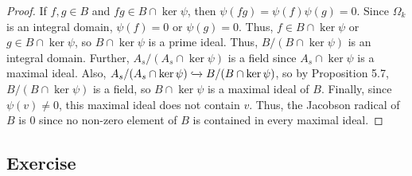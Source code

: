 \begin{proof}
If $f,g\in B$ and $fg \in B \cap \ker \psi$, then $\psi(fg) = \psi(f)\psi(g) = 0$. Since $\Omega_k$ is an integral domain, $\psi(f) = 0$ or $\psi(g) = 0$. 
Thus, $f \in B \cap \ker \psi$ or $g \in B \cap \ker \psi$, so $B \cap \ker \psi$ is a prime ideal. Thus, $B / (B \cap \ker \psi)$ is an integral domain.
Further, $A_s / (A_s \cap \ker \psi)$ is a field since $A_s \cap \ker \psi$ is a maximal ideal. Also, $A_s / (A_s \cap \ker \psi) \xhookrightarrow{} B / (B \cap \ker \psi)$,
so by Proposition 5.7, $B / (B \cap \ker \psi)$ is a field, so $B \cap \ker \psi$ is a maximal ideal of $B$. Finally, since $\psi(v) \neq 0$, this maximal
ideal does not contain $v$. Thus, the Jacobson radical of $B$ is $0$ since no non-zero element of $B$ is contained in every maximal ideal.
\end{proof}

\subsection{Exercise}\label{5.23}

